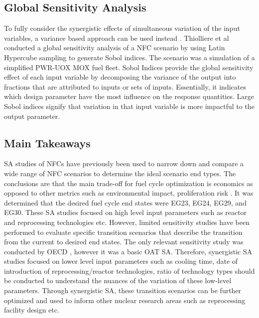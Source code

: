 \subsection{Global Sensitivity Analysis}
To fully consider the synergistic effects of
simultaneous variation of the input variables, a variance 
based approach can be used instead \cite{thiolliere_methodology_2018}.
Thiolliere et al conducted a global sensitivity analysis of a 
\gls{NFC} scenario by using Latin Hypercube sampling 
to generate Sobol indices. 
The scenario was a simulation of a simplified PWR-UOX MOX fuel 
fleet. 
Sobol Indices provide the global sensitivity effect of each input 
variable by decomposing the variance of the output into fractions 
that are attributed to inputs or sets of inputs. 
Essentially, it indicates which design parameter have the most 
influence on the response quantities. 
Large Sobol indices signify that variation in that 
input variable is more impactful to the output parameter. 

\subsection{Main Takeaways}
\gls{SA} studies of \glspl{NFC} have previously been used to narrow 
down and compare a wide range of \gls{NFC} scenarios to determine 
the ideal scenario end types. 
The conclusions are that the main trade-off for fuel cycle 
optimization is economics as opposed to
other metrics such as environmental impact, proliferation 
risk \cite{passerini_systematic_2014}.
It was determined that the desired fuel cycle end states 
were EG23, EG24, EG29, and EG30.
These \gls{SA} studies focused on high level input 
parameters such as reactor and reprocessing technologies etc.
However, limited sensitivity studies have been performed to 
evaluate specific transition scenarios that describe the transition 
from the current to desired end states.
The only relevant sensitivity study was conducted by OECD 
\cite{noauthor_effects_2017}, however it was a basic OAT 
\gls{SA}.   
Therefore, synergistic \gls{SA} studies focused on
lower level input parameters such as cooling time, 
date of introduction of reprocessing/reactor 
technologies, ratio of technology types should be conducted to 
understand the nuances of the variation of these low-level parameters. 
Through synergistic \gls{SA}, these transition scenarios can be 
further optimized and used to inform other nuclear research areas 
such as reprocessing facility design etc. 

